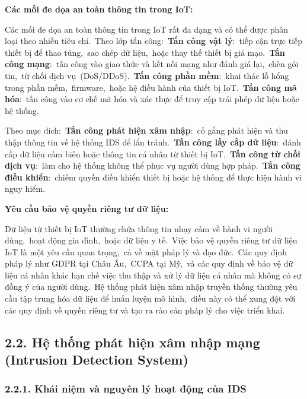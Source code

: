 \textbf{Các mối đe dọa an toàn thông tin trong IoT:}

Các mối đe dọa an toàn thông tin trong IoT rất đa dạng và có thể được phân loại theo nhiều tiêu chí.~Theo lớp tấn công:~\textbf{Tấn công vật lý}:~tiếp cận trực tiếp thiết bị để thao túng,~sao chép dữ liệu,~hoặc thay thế thiết bị giả mạo.~\textbf{Tấn công mạng}:~tấn công vào giao thức và kết nối mạng như đánh giá lại,~chèn gói tin,~từ chối dịch vụ~(DoS/DDoS).~\textbf{Tấn công phần mềm}:~khai thác lỗ hổng trong phần mềm,~firmware,~hoặc hệ điều hành của thiết bị IoT.~\textbf{Tấn công mã hóa}:~tấn công vào cơ chế mã hóa và xác thực để truy cập trái phép dữ liệu hoặc hệ thống.

Theo mục đích:~\textbf{Tấn công phát hiện xâm nhập}:~cố gắng phát hiện và thu thập thông tin về hệ thống IDS để lẩn tránh.~\textbf{Tấn công lấy cắp dữ liệu}:~đánh cắp dữ liệu cảm biến hoặc thông tin cá nhân từ thiết bị IoT.~\textbf{Tấn công từ chối dịch vụ}:~làm cho hệ thống không thể phục vụ người dùng hợp pháp.~\textbf{Tấn công điều khiển}:~chiếm quyền điều khiển thiết bị hoặc hệ thống để thực hiện hành vi nguy hiểm.

\textbf{Yêu cầu bảo vệ quyền riêng tư dữ liệu:}

Dữ liệu từ thiết bị IoT thường chứa thông tin nhạy cảm về hành vi người dùng,~hoạt động gia đình,~hoặc dữ liệu y tế.~Việc bảo vệ quyền riêng tư dữ liệu IoT là một yêu cầu quan trọng,~cả về mặt pháp lý và đạo đức.~Các quy định pháp lý như GDPR tại Châu Âu,~CCPA tại Mỹ,~và các quy định về bảo vệ dữ liệu cá nhân khác hạn chế việc thu thập và xử lý dữ liệu cá nhân mà không có sự đồng ý của người dùng.~Hệ thống phát hiện xâm nhập truyền thống thường yêu cầu tập trung hóa dữ liệu để huấn luyện mô hình,~điều này có thể xung đột với các quy định về quyền riêng tư và tạo ra rào cản pháp lý cho việc triển khai.

\subsection{2.2. Hệ thống phát hiện xâm nhập mạng (Intrusion Detection System)}\label{hux1ec7-thux1ed1ng-phuxe1t-hiux1ec7n-xuxe2m-nhux1eadp-mux1ea1ng-intrusion-detection-system}

\subsubsection{2.2.1. Khái niệm và nguyên lý hoạt động của IDS}\label{khuxe1i-niux1ec7m-vuxe0-nguyuxean-luxfd-houx1ea1t-ux111ux1ed9ng-cux1ee7a-ids}

